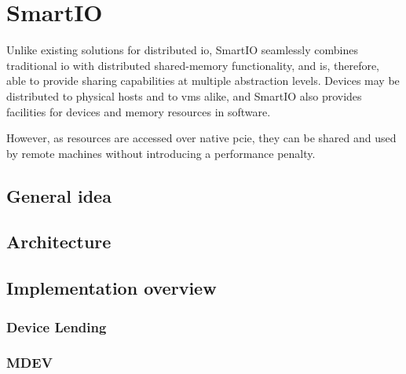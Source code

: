 \chapter{SmartIO}\label{chapter:smartio}

Unlike existing solutions for distributed \gls{io}, SmartIO seamlessly combines traditional \gls{io} with distributed shared-memory functionality, and is, therefore, able to provide sharing capabilities at multiple abstraction levels.
Devices may be distributed to physical hosts and to \glspl{vm} alike, and SmartIO also provides facilities for  devices and memory resources in software.


However, as resources are accessed over native \gls{pcie}, they can be shared and used by remote machines without introducing a performance penalty.
\section{General idea}\label{sec:idea}
\section{Architecture}\label{sec:overview}

\section{Implementation overview}\label{sec:impl}
\subsection{Device Lending}
\subsection{MDEV}
